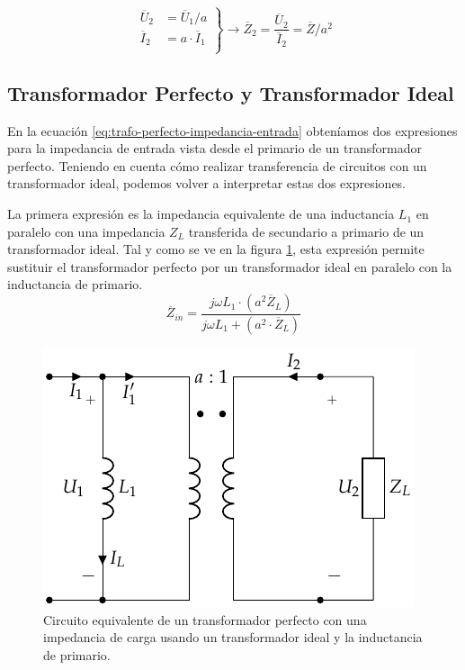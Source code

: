 \begin{itemize}
\begin{center}
  \end{center}
  \[
    \left.
      \begin{array}{ll}
        \overline{U}_2 &= \overline{U}_1 /a\\
        \overline{I}_2 &= a \cdot \overline{I}_1\\
      \end{array}\right\}
    \rightarrow \boxed{\overline{Z}_2 =
      \frac{\overline{U}_2}{\overline{I}_2} = \overline{Z} / a^2}
  \]
\end{itemize}

\subsection{Transformador Perfecto y Transformador Ideal}
\label{sec:perfecto-vs-ideal}

En la ecuación \ref{eq:trafo-perfecto-impedancia-entrada} obteníamos dos expresiones para la impedancia de entrada vista desde el primario de un transformador perfecto. Teniendo en cuenta cómo realizar transferencia de circuitos con un transformador ideal, podemos volver a interpretar estas dos expresiones.

La primera expresión es la impedancia equivalente de una inductancia $L_1$ en paralelo con una impedancia $Z_L$ transferida de secundario a primario de un transformador ideal. Tal y como se ve en la figura \ref{fig:trafo-perfecto-ideal-L1}, esta expresión permite sustituir el transformador perfecto por un transformador ideal en paralelo con la inductancia de primario.
  \[
    \overline{Z}_{in} = \frac{j \omega L_1 \cdot (a^2
    \overline{Z}_L)}{j\omega L_1 + (a^2 \cdot \overline{Z}_L)}
  \]
  \begin{figure}
    \centering
    \includegraphics[height=.2\textheight]{../figs/TrafoPerfecto_Ideal.pdf}
    
    \caption{Circuito equivalente de un transformador perfecto con una impedancia de carga usando un transformador ideal y la inductancia de primario.}
    \label{fig:trafo-perfecto-ideal-L1}
  \end{figure}

